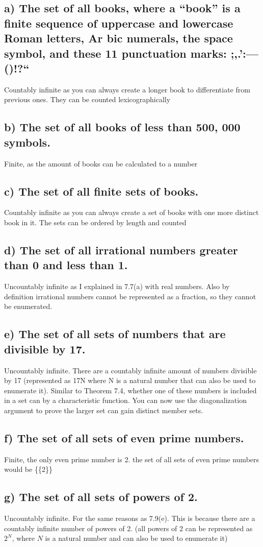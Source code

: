 \documentclass{article}
\begin{document}
\subsection*{a) The set of all books, where a “book” is a finite sequence of uppercase and lowercase Roman letters, Ar bic numerals, the space symbol, and these 11 punctuation marks: ;,.’:—()!?“}
Countably infinite as you can always create a longer book to differentiate from previous ones. They can be counted lexicographically
\subsection*{b) The set of all books of less than 500, 000 symbols.}
Finite, as the amount of books can be calculated to a number
\subsection*{c) The set of all finite sets of books.}
Countably infinite as you can always create a set of books with one more distinct book in it. The sets can be ordered by length and counted
\subsection*{d) The set of all irrational numbers greater than 0 and less than 1.}
Uncountably infinite as I explained in 7.7(a) with real numbers. Also by definition irrational numbers cannot be represented as a fraction, so they cannot be enumerated.
\subsection*{e) The set of all sets of numbers that are divisible by 17.}
Uncountably infinite. There are a countably infinite amount of numbers divisible by 17 (represented as 17N where N is a natural number that can also be used to enumerate it). Similar to Theorem 7.4, whether one of these numbers is included in a set can by a characteristic function. You can now use the diagonalization argument to prove the larger set can gain distinct member sets.
\subsection*{f) The set of all sets of even prime numbers.}
Finite, the only even prime number is 2. the set of all sets of even prime numbers would be \{\{2\}\}
\subsection*{g) The set of all sets of powers of 2.}
Uncountably infinite. For the same reasons as 7.9(e). This is because there are a countably infinite number of powers of 2. (all powers of 2 can be represented as $2^N$, where $N$ is a natural number and can also be used to enumerate it)
\end{document}
